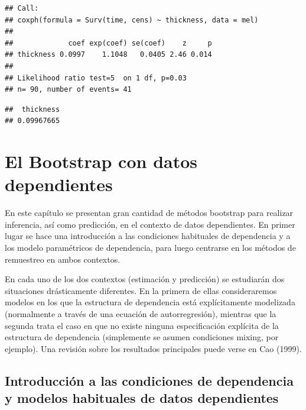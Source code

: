 \documentclass[]{book}
\newenvironment{Shaded}{\begin{snugshade}}{\end{snugshade}}
\newcommand{\CommentTok}[1]{\textcolor[rgb]{0.56,0.35,0.01}{\textit{#1}}}
\newcommand{\OperatorTok}[1]{\textcolor[rgb]{0.81,0.36,0.00}{\textbf{#1}}}
\newcommand{\NormalTok}[1]{#1}
\theoremstyle{definition}
\theoremstyle{definition}
\theoremstyle{definition}
\theoremstyle{remark}
\begin{document}
\begin{verbatim}
## Call:
## coxph(formula = Surv(time, cens) ~ thickness, data = mel)
## 
##             coef exp(coef) se(coef)    z     p
## thickness 0.0997    1.1048   0.0405 2.46 0.014
## 
## Likelihood ratio test=5  on 1 df, p=0.03
## n= 90, number of events= 41
\end{verbatim}

\begin{Shaded}
\end{Shaded}

\begin{verbatim}
##  thickness 
## 0.09967665
\end{verbatim}

\chapter{El Bootstrap con datos dependientes}\label{cap9}

En este capítulo se presentan gran cantidad de métodos bootstrap para
realizar inferencia, así como predicción, en el contexto de datos
dependientes. En primer lugar se hace una introducción a las condiciones
habituales de dependencia y a los modelo paramétricos de dependencia,
para luego centrarse en los métodos de remuestreo en ambos contextos.

En cada uno de los dos contextos (estimación y predicción) se estudiarán
dos situaciones drásticamente diferentes. En la primera de ellas
consideraremos modelos en los que la estructura de dependencia está
explícitamente modelizada (normalmente a través de una ecuación de
autorregresión), mientras que la segunda trata el caso en que no existe
ninguna especificación explícita de la estructura de dependencia
(simplemente se asumen condiciones mixing, por ejemplo). Una revisión
sobre los resultados principales puede verse en Cao (1999).

\section{Introducción a las condiciones de dependencia y modelos
habituales de datos
dependientes}\label{introduccion-a-las-condiciones-de-dependencia-y-modelos-habituales-de-datos-dependientes}
\end{document}
